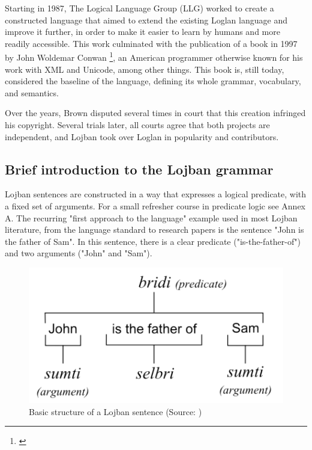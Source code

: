 Starting in 1987, The Logical Language Group (LLG) worked to create a constructed language that aimed to extend the existing Loglan language and improve it further,
in order to make it easier to learn by humans and more readily accessible. This work culminated with the publication of a book in 1997 by
John Woldemar Conwan \footnote{\cite{cowan1997complete}}, an American programmer otherwise known for his work with XML and Unicode, among other things. This book is,
still today, considered the baseline of the language, defining its whole grammar, vocabulary, and semantics.\newline

Over the years, Brown disputed several times in court that this creation infringed his copyright. Several trials later, all courts agree that both projects are independent,
and Lojban took over Loglan in popularity and contributors.

\subsection{Brief introduction to the Lojban grammar}

Lojban sentences are constructed in a way that expresses a logical predicate, with a fixed set of arguments. For a small
refresher course in predicate logic see Annex A. The recurring "first approach to the language" example used in most Lojban
literature, from the language standard to research papers is the sentence "John is the father of Sam". In this sentence, there
is a clear predicate ("is-the-father-of") and two arguments ("John" and "Sam").

\begin{figure}[H]
\centering
\includegraphics[scale=0.20]{images/lojban_grammar.png}
\caption{Basic structure of a Lojban sentence (Source: \cite{cowan1997complete})}
\end{figure}

